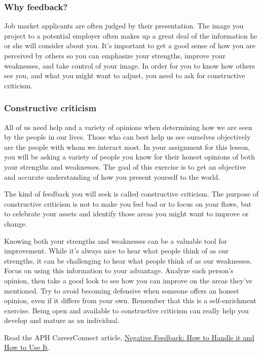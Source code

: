 \subsubsection*{Why feedback?}
Job market applicants are often judged by their presentation. The image you project to a potential employer often makes up a great deal of the information he or she will consider about you. It's important to get a good sense of how you are perceived by others so you can emphasize your strengths, improve your weaknesses, and take control of your image. In order for you to know how others see you, and what you might want to adjust, you need to ask for constructive criticism.

\subsubsection*{Constructive criticism}
All of us need help and a variety of opinions when determining how we are seen by the people in our lives. Those who can best help us see ourselves objectively are the people with whom we interact most. In your assignment for this lesson, you will be asking a variety of people you know for their honest opinions of both your strengths and weaknesses. The goal of this exercise is to get an objective and accurate understanding of how you present yourself to the world.

The kind of feedback you will seek is called constructive criticism. The purpose of constructive criticism is not to make you feel bad or to focus on your flaws, but to celebrate your assets and identify those areas you might want to improve or change.

Knowing both your strengths and weaknesses can be a valuable tool for improvement. While it's always nice to hear what people think of as our strengths, it can be challenging to hear what people think of as our weaknesses. Focus on using this information to your advantage. Analyze each person's opinion, then take a good look to see how you can improve on the areas they've mentioned. Try to avoid becoming defensive when someone offers an honest opinion, even if it differs from your own. Remember that this is a self-enrichment exercise. Being open and available to constructive criticism can really help you develop and mature as an individual.

Read the APH CareerConnect article, \href{https://aphconnectcenter.org/self-advocacy/negative-feedback-how-to-handle-it-and-how-to-use-it/}{Negative Feedback: How to Handle it and How to Use It}.

